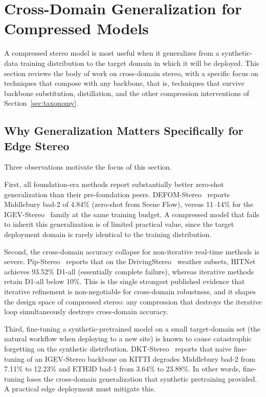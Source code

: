 \section{Cross-Domain Generalization for Compressed Models}
\label{sec:generalization}

A compressed stereo model is most useful when it generalizes from a synthetic-data training distribution to the target domain in which it will be deployed. This section reviews the body of work on cross-domain stereo, with a specific focus on techniques that compose with any backbone, that is, techniques that survive backbone substitution, distillation, and the other compression interventions of Section~\ref{sec:taxonomy}.

\subsection{Why Generalization Matters Specifically for Edge Stereo}

Three observations motivate the focus of this section.

First, all foundation-era methods report substantially better zero-shot generalization than their pre-foundation peers. DEFOM-Stereo~\cite{jiang2025defom} reports Middlebury bad-2 of 4.84\% (zero-shot from Scene Flow), versus 11--14\% for the IGEV-Stereo~\cite{xu2023igev} family at the same training budget. A compressed model that fails to inherit this generalization is of limited practical value, since the target deployment domain is rarely identical to the training distribution.

Second, the cross-domain accuracy collapse for non-iterative real-time methods is severe. Pip-Stereo~\cite{zheng2026pipstereo} reports that on the DrivingStereo~\cite{yang2019drivingstereo} weather subsets, HITNet~\cite{tankovich2021hitnet} achieves 93.52\% D1-all (essentially complete failure), whereas iterative methods retain D1-all below 10\%. This is the single strongest published evidence that iterative refinement is non-negotiable for cross-domain robustness, and it shapes the design space of compressed stereo: any compression that destroys the iterative loop simultaneously destroys cross-domain accuracy.

Third, fine-tuning a synthetic-pretrained model on a small target-domain set (the natural workflow when deploying to a new site) is known to cause catastrophic forgetting on the synthetic distribution. DKT-Stereo~\cite{zhang2024dkt} reports that naive fine-tuning of an IGEV-Stereo backbone on KITTI degrades Middlebury bad-2 from 7.11\% to 12.23\% and ETH3D bad-1 from 3.64\% to 23.88\%. In other words, fine-tuning loses the cross-domain generalization that synthetic pretraining provided. A practical edge deployment must mitigate this.

